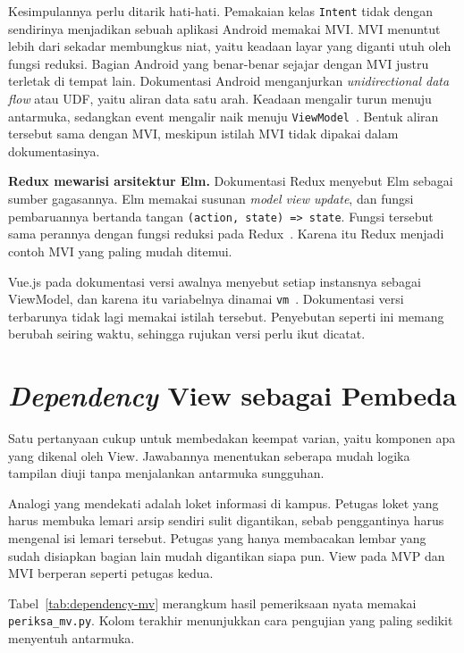 Kesimpulannya perlu ditarik hati-hati. Pemakaian kelas \texttt{Intent} tidak
dengan sendirinya menjadikan sebuah aplikasi Android memakai MVI. MVI menuntut
lebih dari sekadar membungkus niat, yaitu keadaan layar yang diganti utuh oleh
fungsi reduksi. Bagian Android yang benar-benar sejajar dengan MVI justru
terletak di tempat lain. Dokumentasi Android menganjurkan
\textit{unidirectional data flow} atau UDF, yaitu aliran data satu arah.
Keadaan mengalir turun menuju antarmuka, sedangkan event mengalir naik
menuju \texttt{ViewModel}~\cite{android2026uilayer}. Bentuk aliran tersebut sama
dengan MVI, meskipun istilah MVI tidak dipakai dalam dokumentasinya.

\textbf{Redux mewarisi arsitektur Elm.} Dokumentasi Redux menyebut Elm sebagai
sumber gagasannya. Elm memakai susunan \textit{model view update}, dan fungsi
pembaruannya bertanda tangan \texttt{(action, state) => state}. Fungsi tersebut
sama perannya dengan fungsi reduksi pada Redux~\cite{redux2026priorart}. Karena
itu Redux menjadi contoh MVI yang paling mudah ditemui.

Vue.js pada dokumentasi versi awalnya menyebut setiap instansnya sebagai
ViewModel, dan karena itu variabelnya dinamai \texttt{vm}~\cite{vue2016instance}.
Dokumentasi versi terbarunya tidak lagi memakai istilah tersebut. Penyebutan
seperti ini memang berubah seiring waktu, sehingga rujukan versi perlu ikut
dicatat.

\section{\textit{Dependency} View sebagai Pembeda}

Satu pertanyaan cukup untuk membedakan keempat varian, yaitu komponen apa yang
dikenal oleh View. Jawabannya menentukan seberapa mudah logika tampilan diuji
tanpa menjalankan antarmuka sungguhan.

Analogi yang mendekati adalah loket informasi di kampus. Petugas loket yang
harus membuka lemari arsip sendiri sulit digantikan, sebab penggantinya harus
mengenal isi lemari tersebut. Petugas yang hanya membacakan lembar yang sudah
disiapkan bagian lain mudah digantikan siapa pun. View pada MVP dan MVI berperan
seperti petugas kedua.

Tabel~\ref{tab:dependency-mv} merangkum hasil pemeriksaan nyata memakai
\texttt{periksa\_mv.py}. Kolom terakhir menunjukkan cara pengujian yang paling
sedikit menyentuh antarmuka.

